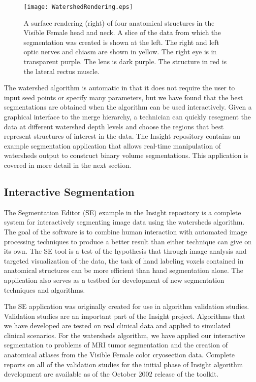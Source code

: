 \begin{figure}
\centering
\texttt{[image: WatershedRendering.eps]}
\caption{A surface rendering (right) of four anatomical structures in the Visible
Female head and neck. A slice of the data from which the segmentation was
created is shown at the left.  The right and left optic nerves and chiasm are
shown in yellow.  The right eye is in transparent purple.  The lens is dark
purple.  The structure in red is the lateral rectus muscle.}
\protect\label{fig:surfaceRenderingWatersheds}
\end{figure}

The watershed algorithm is automatic in that it does not require the user to
input seed points or specify many parameters, but we have found that the best
segmentations are obtained when the algorithm can be used interactively.  Given
a graphical interface to the merge hierarchy, a technician can quickly
resegment the data at different watershed depth levels and choose the regions
that best represent structures of interest in the data.  The Insight
repository contains an example segmentation application that allows real-time
manipulation of watersheds output to construct binary volume segmentations.
This application is covered in more detail in the next section.

\subsection{Interactive Segmentation}
\label{sec:SegmentationEditorWatersheds}
The Segmentation Editor (SE) example in the Insight repository is a complete
system for interactively segmenting image data using the watersheds algorithm.
The goal of the software is to combine human interaction with automated image
processing techniques to produce a better result than either technique can give
on its own. The SE tool is a test of the hypothesis that through image analysis
and targeted visualization of the data, the task of hand labeling voxels
contained in anatomical structures can be more efficient than hand segmentation
alone.  The application also serves as a testbed for development of new
segmentation techniques and algorithms.

The SE application was originally created for use in algorithm validation
studies.  Validation studies are an important part of the Insight project.
Algorithms that we have developed are tested on real clinical data and applied
to simulated clinical scenarios.  For the watersheds algorithm, we have applied
our interactive segmentation to problems of MRI tumor segmentation and the
creation of anatomical atlases from the Visible Female color cryosection data.
Complete reports on all of the validation studies for the initial phase of
Insight algorithm development are available as of the October 2002 release of
the toolkit.

